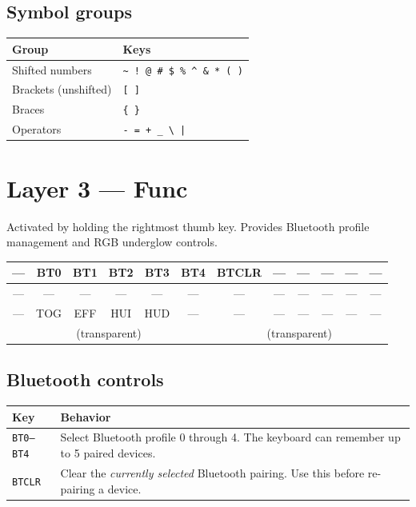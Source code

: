 \documentclass[11pt, letterpaper]{article}
\begin{document}
\subsection*{Symbol groups}

\begin{tabular}{ll}
\toprule
\textbf{Group}             & \textbf{Keys} \\
\midrule
Shifted numbers            & \texttt{\~{} ! @ \# \$ \% \^{} \& * ( )} \\
Brackets (unshifted)       & \texttt{[ ]} \\
Braces                     & \texttt{\{ \}} \\
Operators                  & \texttt{- = + \_ \textbackslash{} |} \\
\bottomrule
\end{tabular}

\section{Layer 3 — Func}

Activated by holding the rightmost thumb key. Provides Bluetooth
profile management and RGB underglow controls.

\begin{center}
\renewcommand{\arraystretch}{1.4}
\begin{tabular}{|c|c|c|c|c|c||c|c|c|c|c|c|}
\hline
--- & BT0 & BT1 & BT2 & BT3 & BT4 & BTCLR & --- & --- & --- & --- & --- \\
\hline
--- & --- & --- & --- & --- & --- & --- & --- & --- & --- & --- & --- \\
\hline
--- & TOG & EFF & HUI & HUD & --- & --- & --- & --- & --- & --- & --- \\
\hline
\multicolumn{6}{|c|}{(transparent)} &
\multicolumn{6}{c|}{(transparent)} \\
\hline
\end{tabular}
\end{center}

\subsection*{Bluetooth controls}

\begin{tabular}{lp{9cm}}
\toprule
\textbf{Key}       & \textbf{Behavior} \\
\midrule
\texttt{BT0--BT4}  & Select Bluetooth profile 0 through 4. The keyboard
                     can remember up to 5 paired devices. \\
\texttt{BTCLR}     & Clear the \emph{currently selected} Bluetooth pairing.
                     Use this before re-pairing a device. \\
\bottomrule
\end{tabular}
\end{document}
